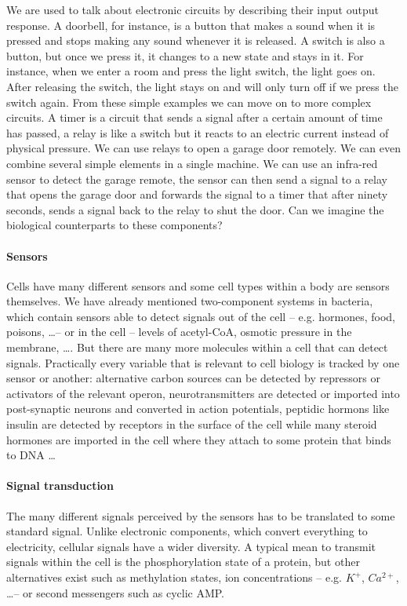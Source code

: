 We are used to talk about electronic circuits by describing their input output response. A doorbell, for instance, is a button that makes a sound when it is pressed and stops making any sound whenever it is released.  A switch is also a button, but once we press it, it changes to a new state and stays in it. For instance, when we enter a room and press the light switch, the light goes on. After releasing the switch, the light stays on and will only turn off if we press the switch again. From these simple examples we can move on to more complex circuits. A  timer is a circuit that sends a signal after a certain amount of time has passed, a relay is like a switch but it reacts to an electric current instead of physical pressure. We can use relays to open a garage door remotely. We can even combine several simple elements in a single machine. We can use an infra-red sensor to detect the garage remote, the sensor can then send a signal to a relay that opens the garage door and forwards the signal to a timer that after ninety seconds, sends a signal back to the relay to shut the door. Can we imagine the biological counterparts to these components?

\paragraph{Sensors} Cells have many different sensors and some cell types within a body are sensors themselves. We have already mentioned two-component systems in bacteria, which contain sensors able to detect signals out of the cell -- e.g. hormones, food, poisons, \dots -- or in the cell -- levels of acetyl-CoA, osmotic pressure in the membrane, \dots. But there are many more molecules within a cell that can detect signals. Practically every variable that is relevant to cell biology is tracked by one sensor or another: alternative carbon sources can be detected by repressors or activators of the relevant operon, neurotransmitters are detected or imported into post-synaptic neurons  and converted in action potentials, peptidic hormons like insulin are detected by receptors in the surface of the cell while many steroid hormones are imported in the cell where they attach to some protein that binds to DNA \dots 

\paragraph{Signal transduction} The many different signals perceived by the sensors has to be translated to some standard signal. Unlike electronic components, which convert everything to electricity, cellular signals have a wider diversity. A typical mean to transmit signals within the cell is the phosphorylation state of a protein, but other alternatives exist such as methylation states, ion concentrations -- e.g. $K^+$, $Ca^{2+}$, \dots -- or second messengers such as cyclic AMP.
